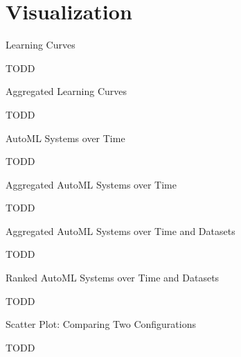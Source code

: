 \section{Visualization}
\begin{frame}[c]{Learning Curves}

TODD


\end{frame}
\begin{frame}[c]{Aggregated Learning Curves}

TODD


\end{frame}
\begin{frame}[c]{AutoML Systems over Time}

TODD


\end{frame}
\begin{frame}[c]{Aggregated AutoML Systems over Time}

TODD


\end{frame}
\begin{frame}[c]{Aggregated AutoML Systems over Time and Datasets}

TODD


\end{frame}
\begin{frame}[c]{Ranked AutoML Systems over Time and Datasets}

TODD


\end{frame}
\begin{frame}[c]{Scatter Plot: Comparing Two Configurations}

TODD


\end{frame}
